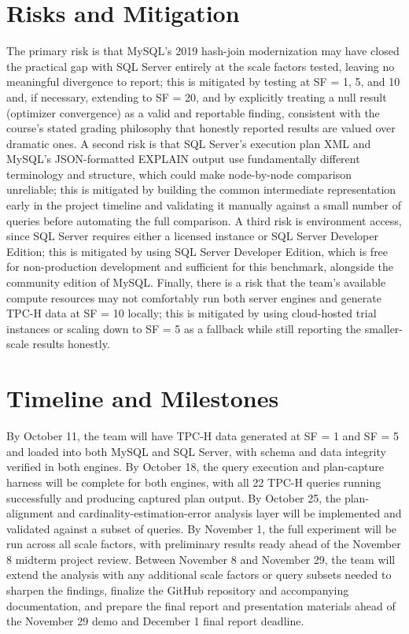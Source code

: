 \documentclass[conference]{IEEEtran}
\begin{document}
\section{Risks and Mitigation}
The primary risk is that MySQL's 2019 hash-join modernization may have closed the practical gap with SQL Server entirely at the scale factors tested, leaving no meaningful divergence to report; this is mitigated by testing at SF = 1, 5, and 10 and, if necessary, extending to SF = 20, and by explicitly treating a null result (optimizer convergence) as a valid and reportable finding, consistent with the course's stated grading philosophy that honestly reported results are valued over dramatic ones. A second risk is that SQL Server's execution plan XML and MySQL's JSON-formatted EXPLAIN output use fundamentally different terminology and structure, which could make node-by-node comparison unreliable; this is mitigated by building the common intermediate representation early in the project timeline and validating it manually against a small number of queries before automating the full comparison. A third risk is environment access, since SQL Server requires either a licensed instance or SQL Server Developer Edition; this is mitigated by using SQL Server Developer Edition, which is free for non-production development and sufficient for this benchmark, alongside the community edition of MySQL. Finally, there is a risk that the team's available compute resources may not comfortably run both server engines and generate TPC-H data at SF = 10 locally; this is mitigated by using cloud-hosted trial instances or scaling down to SF = 5 as a fallback while still reporting the smaller-scale results honestly.

\section{Timeline and Milestones}
By October 11, the team will have TPC-H data generated at SF = 1 and SF = 5 and loaded into both MySQL and SQL Server, with schema and data integrity verified in both engines. By October 18, the query execution and plan-capture harness will be complete for both engines, with all 22 TPC-H queries running successfully and producing captured plan output. By October 25, the plan-alignment and cardinality-estimation-error analysis layer will be implemented and validated against a subset of queries. By November 1, the full experiment will be run across all scale factors, with preliminary results ready ahead of the November 8 midterm project review. Between November 8 and November 29, the team will extend the analysis with any additional scale factors or query subsets needed to sharpen the findings, finalize the GitHub repository and accompanying documentation, and prepare the final report and presentation materials ahead of the November 29 demo and December 1 final report deadline.
\end{document}
